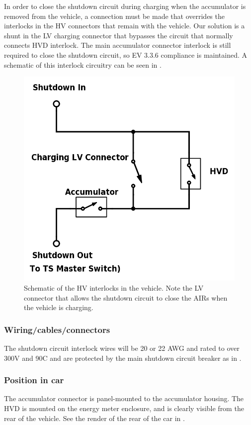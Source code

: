\documentclass{article}
\begin{document}
In order to close the shutdown circuit during charging when the accumulator is removed from the vehicle, a connection must be made that overrides the interlocks in the HV connectors that remain with the vehicle. Our solution is a shunt in the LV charging connector that bypasses the circuit that normally connects HVD interlock. The main accumulator connector interlock is still required to close the shutdown circuit, so EV 3.3.6 compliance is maintained. A schematic of this interlock circuitry can be seen in .

\begin{figure}[H]
\centering
\includegraphics[width = .75\textwidth]{HV-connector-schematic.png}
\caption{Schematic of the HV interlocks in the vehicle. Note the LV connector that allows the shutdown circuit to close the AIRs when the vehicle is charging.}
\label{fig:HV_connector_schematic}
\end{figure}

\subsubsection{Wiring/cables/connectors}
The shutdown circuit interlock wires will be 20 or 22 AWG and rated to over 300V and 90\textdegree C and are protected by the main shutdown circuit breaker as in . 

\subsubsection{Position in car}
The accumulator connector is panel-mounted to the accumulator housing. The HVD is mounted on the energy meter enclosure, and is clearly visible from the rear of the vehicle. See the render of the rear of the car in .
\end{document}

